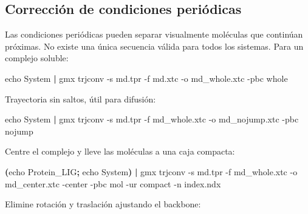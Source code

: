 \documentclass[
  spanish,
  11pt,
  a4paper]{article}
\newenvironment{Shaded}{\begin{snugshade}}{\end{snugshade}}
\newcommand{\AttributeTok}[1]{\textcolor[rgb]{0.13,0.29,0.53}{#1}}
\newcommand{\BuiltInTok}[1]{#1}
\newcommand{\ExtensionTok}[1]{#1}
\newcommand{\KeywordTok}[1]{\textcolor[rgb]{0.13,0.29,0.53}{\textbf{#1}}}
\newcommand{\NormalTok}[1]{#1}
\begin{document}
\subsection{Corrección de condiciones
periódicas}\label{correcciuxf3n-de-condiciones-periuxf3dicas}

Las condiciones periódicas pueden separar visualmente moléculas que
continúan próximas. No existe una única secuencia válida para todos los
sistemas. Para un complejo soluble:

\begin{Shaded}
\begin{Highlighting}[]
\BuiltInTok{echo}\NormalTok{ System }\KeywordTok{|}
\ExtensionTok{gmx}\NormalTok{ trjconv     }\AttributeTok{{-}s}\NormalTok{ md.tpr     }\AttributeTok{{-}f}\NormalTok{ md.xtc     }\AttributeTok{{-}o}\NormalTok{ md\_whole.xtc     }\AttributeTok{{-}pbc}\NormalTok{ whole}
\end{Highlighting}
\end{Shaded}

Trayectoria sin saltos, útil para difusión:

\begin{Shaded}
\begin{Highlighting}[]
\BuiltInTok{echo}\NormalTok{ System }\KeywordTok{|}
\ExtensionTok{gmx}\NormalTok{ trjconv     }\AttributeTok{{-}s}\NormalTok{ md.tpr     }\AttributeTok{{-}f}\NormalTok{ md\_whole.xtc     }\AttributeTok{{-}o}\NormalTok{ md\_nojump.xtc     }\AttributeTok{{-}pbc}\NormalTok{ nojump}
\end{Highlighting}
\end{Shaded}

Centre el complejo y lleve las moléculas a una caja compacta:

\begin{Shaded}
\begin{Highlighting}[]
\KeywordTok{(}\BuiltInTok{echo}\NormalTok{ Protein\_LIG}\KeywordTok{;} \BuiltInTok{echo}\NormalTok{ System}\KeywordTok{)} \KeywordTok{|}
\ExtensionTok{gmx}\NormalTok{ trjconv     }\AttributeTok{{-}s}\NormalTok{ md.tpr     }\AttributeTok{{-}f}\NormalTok{ md\_whole.xtc     }\AttributeTok{{-}o}\NormalTok{ md\_center.xtc     }\AttributeTok{{-}center}     \AttributeTok{{-}pbc}\NormalTok{ mol     }\AttributeTok{{-}ur}\NormalTok{ compact     }\AttributeTok{{-}n}\NormalTok{ index.ndx}
\end{Highlighting}
\end{Shaded}

Elimine rotación y traslación ajustando el backbone:
\end{document}
